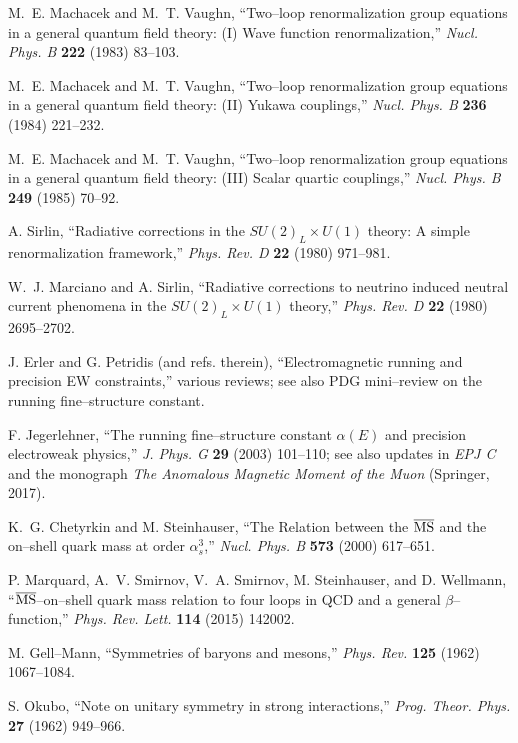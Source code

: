 \documentclass[epjc3]{svjour3}
\begin{document}
M.~E. Machacek and M.~T. Vaughn, ``Two–loop renormalization group equations in a general quantum field theory: (I) Wave function renormalization,'' \emph{Nucl. Phys. B} \textbf{222} (1983) 83–103.

M.~E. Machacek and M.~T. Vaughn, ``Two–loop renormalization group equations in a general quantum field theory: (II) Yukawa couplings,'' \emph{Nucl. Phys. B} \textbf{236} (1984) 221–232.

M.~E. Machacek and M.~T. Vaughn, ``Two–loop renormalization group equations in a general quantum field theory: (III) Scalar quartic couplings,'' \emph{Nucl. Phys. B} \textbf{249} (1985) 70–92.

A. Sirlin, ``Radiative corrections in the $SU(2)_L \times U(1)$ theory: A simple renormalization framework,'' \emph{Phys. Rev. D} \textbf{22} (1980) 971–981.

W.~J. Marciano and A. Sirlin, ``Radiative corrections to neutrino induced neutral current phenomena in the $SU(2)_L \times U(1)$ theory,'' \emph{Phys. Rev. D} \textbf{22} (1980) 2695–2702.

J. Erler and G. Petridis (and refs. therein), ``Electromagnetic running and precision EW constraints,'' various reviews; see also PDG mini–review on the running fine–structure constant.

F. Jegerlehner, ``The running fine–structure constant $\alpha(E)$ and precision electroweak physics,'' \emph{J. Phys. G} \textbf{29} (2003) 101–110; see also updates in \emph{EPJ C} and the monograph \emph{The Anomalous Magnetic Moment of the Muon} (Springer, 2017).

K.~G. Chetyrkin and M. Steinhauser, ``The Relation between the $\overline{\rm MS}$ and the on–shell quark mass at order $\alpha_s^3$,'' \emph{Nucl. Phys. B} \textbf{573} (2000) 617–651.

P. Marquard, A.~V. Smirnov, V.~A. Smirnov, M. Steinhauser, and D. Wellmann, ``$\overline{\rm MS}$–on–shell quark mass relation to four loops in QCD and a general $\beta$–function,'' \emph{Phys. Rev. Lett.} \textbf{114} (2015) 142002.

M. Gell–Mann, ``Symmetries of baryons and mesons,'' \emph{Phys. Rev.} \textbf{125} (1962) 1067–1084.

S. Okubo, ``Note on unitary symmetry in strong interactions,'' \emph{Prog. Theor. Phys.} \textbf{27} (1962) 949–966.
\end{document}

